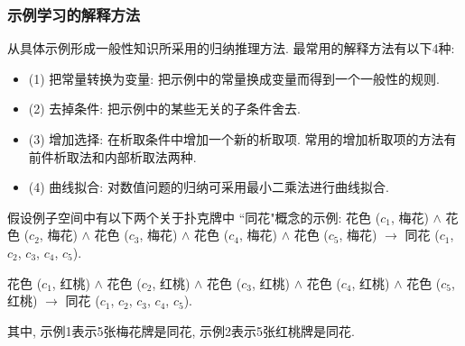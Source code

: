 \subsubsection{示例学习的解释方法}
    从具体示例形成一般性知识所采用的归纳推理方法. 最常用的解释方法有以下4种:
\begin{itemize}
\item (1) 把常量转换为变量: 把示例中的常量换成变量而得到一个一般性的规则.

\item (2) 去掉条件: 把示例中的某些无关的子条件舍去.

\item (3) 增加选择: 在析取条件中增加一个新的析取项. 常用的增加析取项的方法有前件析取法和内部析取法两种.

\item (4) 曲线拟合: 对数值问题的归纳可采用最小二乘法进行曲线拟合.
\end{itemize}
\begin{example}
假设例子空间中有以下两个关于扑克牌中 ``同花"概念的示例:
花色 ($c_1$, 梅花) $\wedge$ 花色 ($c_2$, 梅花) $\wedge$ 花色 ($c_3$, 梅花) $\wedge$ 花色 ($c_4$, 梅花) $\wedge$ 花色 ($c_5$, 梅花) $\rightarrow$ 同花 ($c_1$, $c_2$, $c_3$, $c_4$, $c_5$).

花色 ($c_1$, 红桃) $\wedge$ 花色 ($c_2$, 红桃) $\wedge$ 花色 ($c_3$, 红桃) $\wedge$ 花色 ($c_4$, 红桃) $\wedge$ 花色 ($c_5$, 红桃) $\rightarrow$ 同花 ($c_1$, $c_2$, $c_3$, $c_4$, $c_5$).
\end{example}
其中, 示例1表示5张梅花牌是同花, 示例2表示5张红桃牌是同花.

